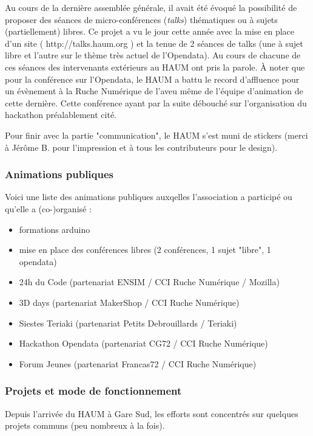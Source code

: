 \documentclass[11pt]{article}
\begin{document}
Au cours de la dernière assemblée générale, il avait été évoqué la possibilité de proposer des séances de micro-conférences (\textit{talks}) thématiques ou à sujets (partiellement) libres.
Ce projet a vu le jour cette année avec la mise en place d'un site ( http://talks.haum.org ) et la tenue de 2 séances de talks (une à sujet libre et l'autre sur le thème très actuel de l'Opendata).
Au cours de chacune de ces séances des intervenants extérieurs au HAUM ont pris la parole. À noter que pour la conférence sur l'Opendata, le HAUM a battu le record d'affluence pour un évènement à la Ruche Numérique de l'aveu même de l'équipe d'animation de cette dernière. Cette conférence ayant par la suite débouché sur l'organisation du hackathon préalablement cité.

Pour finir avec la partie "communication", le HAUM s'est muni de stickers (merci à Jérôme B. pour l'impression et à tous les contributeurs pour le design).

\subsubsection{Animations publiques}

Voici une liste des animations publiques auxqelles l'association a participé ou qu'elle a (co-)organisé :

\begin{itemize}
    \item formations arduino
    \item mise en place des conférences libres (2 conférences, 1 sujet "libre", 1 opendata)
    \item 24h du Code (partenariat ENSIM / CCI Ruche Numérique / Mozilla)
    \item 3D days (partenariat MakerShop / CCI Ruche Numérique)
    \item Siestes Teriaki (partenariat Petits Debrouillards / Teriaki)
    \item Hackathon Opendata (partenariat CG72 / CCI Ruche Numérique)
    \item Forum Jeunes (partenariat Francas72 / CCI Ruche Numérique)
\end{itemize}

\subsubsection{Projets et mode de fonctionnement}

Depuis l'arrivée du HAUM à Gare Sud, les efforts sont concentrés sur quelques projets communs (peu nombreux à la fois).
\end{document}

